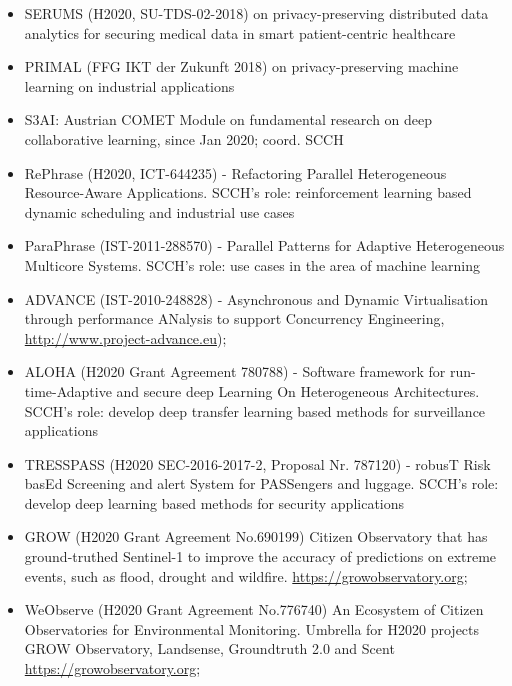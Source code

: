 \documentclass[a4paper,11pt]{article}
\begin{document}
\begin{itemize}
\item SERUMS (H2020, SU-TDS-02-2018) on privacy-preserving distributed data analytics for securing medical data in smart patient-centric healthcare 

\item PRIMAL (FFG IKT der Zukunft 2018) on privacy-preserving machine learning on industrial applications

\item S3AI: Austrian COMET Module on fundamental research on deep collaborative learning, since Jan 2020; coord. SCCH 

\item RePhrase (H2020, ICT-644235) - Refactoring Parallel Heterogeneous Resource-Aware Applications. SCCH's role: reinforcement learning based dynamic scheduling and industrial use cases

\item ParaPhrase (IST-2011-288570) - Parallel Patterns for Adaptive Heterogeneous Multicore Systems. SCCH's role: use cases in the area of machine learning

\item ADVANCE (IST-2010-248828) - Asynchronous and Dynamic Virtualisation through performance ANalysis to support Concurrency Engineering, \url{http://www.project-advance.eu});

\item ALOHA (H2020 Grant Agreement 780788) - Software framework for run-time-Adaptive and secure deep Learning On Heterogeneous Architectures. SCCH's role: develop deep transfer learning based methods for surveillance applications

\item TRESSPASS (H2020 SEC-2016-2017-2, Proposal Nr. 787120) - robusT Risk basEd Screening and alert System for PASSengers and luggage. SCCH's role: develop deep learning based methods for security applications

\item GROW (H2020 Grant Agreement No.690199) Citizen Observatory that has ground-truthed Sentinel-1 to improve the accuracy of predictions on extreme events, such as flood, drought and wildfire. \url{https://growobservatory.org};

\item WeObserve (H2020 Grant Agreement No.776740) An Ecosystem of Citizen Observatories for Environmental Monitoring. Umbrella for H2020 projects GROW Observatory, Landsense, Groundtruth 2.0 and Scent \url{https://growobservatory.org};

\end{itemize}
\end{document}
